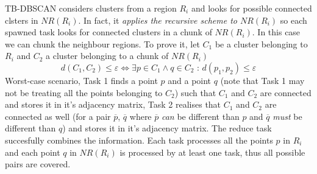 \documentclass[10pt,journal,compsoc]{IEEEtran}
\begin{document}
TB-DBSCAN considers clusters from a region $R_i$ and looks for possible connected clsters in $NR (R_i)$. In fact, it \emph{applies the recursive scheme to $NR (R_i)$} so each spawned task looks for connected clusters in a chunk of $NR (R_i)$. In this case we can chunk the neighbour regions. To prove it, let $C_1$ be a cluster belonging to $R_i$ and $C_2$ a cluster belonging to a chunk of $NR (R_i)$ 
$$ d(C_1, C_2) \leq \varepsilon \Leftrightarrow \exists p \in C_1 \wedge q \in C_2 \text{ : } d(p_1, p_2) \leq \varepsilon $$
Worst-case scenario, Task 1 finds a point $p$ and a point $q$ (note that Task 1 may not be treating all the points belonging to $C_2$) such that $C_1$ and $C_2$ are connected and stores it in it's adjacency matrix, Task 2 realises that $C_1$ and $C_2$ are connected as well (for a pair $\overline{p}$, $\overline{q}$ where $\overline{p}$ \emph{can} be different than $p$ and $\overline{q}$ \emph{must} be different than $q$) and stores it in it's adjacency matrix. The reduce task succesfully combines the information. Each task processes all the points $p$ in $R_i$ and each point $q$ in $NR(R_i)$ is processed by at least one task, thus all possible pairs are covered.
\end{document}
